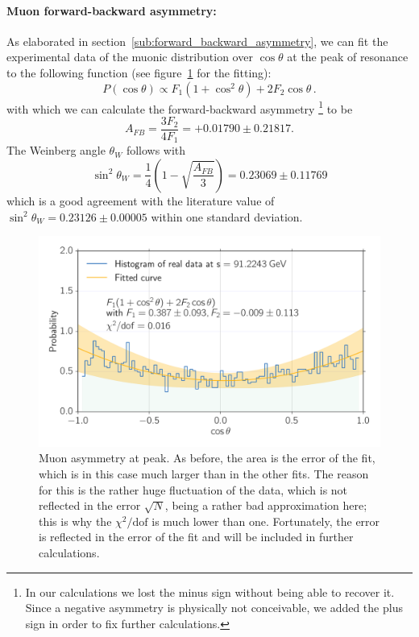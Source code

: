 \paragraph{\textbf{Muon forward-backward asymmetry:}}
\label{par:assymetry}
As elaborated in section~\ref{sub:forward_backward_asymmetry},
we can fit the experimental data of the muonic distribution over $\cos\theta$ at the peak of resonance to the following function
(see figure~\ref{fig:asymmetry} for the fitting):
\begin{equation}
    P(\cos\theta) \propto F_1 ( 1+ \cos^2\theta) + 2 F_2 \cos\theta \, .
\end{equation}
with which we can calculate the forward-backward asymmetry%
\footnote{In our calculations we lost the minus sign without being
    able to recover it. Since a negative
asymmetry is physically not conceivable, we added the plus sign in order to fix further calculations.}
to be
\begin{equation}
    A_{FB} = \frac{3 F_2}{4 F_1} = +0.01790 \pm 0.21817.
\end{equation}
The Weinberg angle $\theta_W$ follows with
\begin{equation}
    \sin^2 \theta_W = \frac{1}{4} \left( 1 - \sqrt{ \frac{A_{FB}}{3}} \right)  = 0.23069 \pm 0.11769
\end{equation}
which is a good agreement with the literature value \cite{pdg} of $\sin^2 \theta_W = 0.23126 \pm 0.00005$ within
one standard deviation.


\begin{figure}[htpb]
    \centering
    \includegraphics[width=1.0\linewidth]{figures/assymetry}
    \caption{Muon asymmetry at peak. As before, the area is the error of the fit, which is in this case much larger than in
    the other fits. The reason for this is the rather huge fluctuation of the data, which is not reflected in the error 
    $\sqrt{N}$, being a rather bad approximation here; this is why the $\chi^2 / \mathrm{dof}$ is much lower than one.
    Fortunately, the error is reflected in the error of the fit and will be included in further calculations.
}
    \label{fig:asymmetry}
\end{figure}

